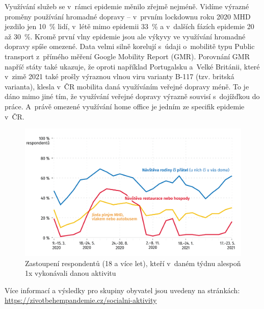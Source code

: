 Využívání služeb se v rámci epidemie měnilo zřejmě nejméně. Vidíme výrazné proměny používání hromadné dopravy – v~prvním lockdownu roku 2020 MHD jezdilo jen 10~\% lidí, v létě mimo epidemii 33~\% a v~dalších fázích epidemie 20 až 30~\%. Kromě první vlny epidemie jsou ale výkyvy ve využívání hromadné dopravy spíše omezené. Data velmi silně korelují s~údaji o~mobilitě typu Public transport z přímého měření Google Mobility Report (GMR). Porovnání GMR napříč státy také ukazuje, že oproti například Portugalsku a Velké Británii, které v zimě 2021 také prošly výraznou vlnou viru varianty B-117 (tzv. britská varianta), klesla v~ČR mobilita daná využíváním veřejné dopravy méně. To je dáno mimo jiné tím, že využívání veřejné dopravy výrazně souvisí s dojížďkou do práce. A~právě omezené využívání home office je jedním ze specifik epidemie v ČR.

\begin{figure}[ht]
    \centering
    \includegraphics[width=\textwidth]{./pic/zbp-graf3.png}
    \caption{Zastoupení respondentů (18 a více let), kteří v daném týdnu alespoň 1x vykonávali danou aktivitu}
    \label{fig:zbp3}
\end{figure}


Více informací a výsledky pro skupiny obyvatel jsou uvedeny na stránkách: \url{https://zivotbehempandemie.cz/socialni-aktivity}



